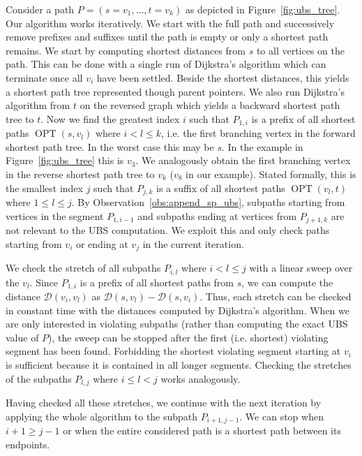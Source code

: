 \documentclass[a4paper,UKenglish,cleveref, autoref, thm-restate]{lipics-v2021}
\newcommand*{\dist}{\mathcal{D}}
\newcommand*{\shp}{\operatorname{OPT}}
\begin{document}
Consider a path $P=(s=v_1,\dots,t=v_k)$ as depicted in Figure~\ref{fig:ubs_tree}.
Our algorithm works iteratively.
We start with the full path and successively remove prefixes and suffixes until the path is empty or only a shortest path remains.
We start by computing shortest distances from $s$ to all vertices on the path.
This can be done with a single run of Dijkstra's algorithm which can terminate once all $v_i$ have been settled.
Beside the shortest distances, this yields a shortest path tree represented though parent pointers.
We also run Dijkstra's algorithm from $t$ on the reversed graph which yields a backward shortest path tree to $t$.
Now we find the greatest index $i$ such that $P_{1,i}$ is a prefix of all shortest paths $\shp(s, v_l)$ where $i < l \leq k$, i.e. the first branching vertex in the forward shortest path tree.
In the worst case this may be $s$.
In the example in Figure~\ref{fig:ubs_tree} this is $v_3$.
We analogously obtain the first branching vertex in the reverse shortest path tree to $v_k$ ($v_8$ in our example).
Stated formally, this is the smallest index $j$ such that $P_{j,k}$ is a suffix of all shortest paths $\shp(v_l, t)$ where $1 \leq l \leq j$.
By Observation~\ref{obs:append_sp_ubs}, subpaths starting from vertices in the segment $P_{1,i-1}$ and subpaths ending at vertices from $P_{j+1,k}$ are not relevant to the UBS computation.
We exploit this and only check paths starting from $v_i$ or ending at $v_j$ in the current iteration.

We check the stretch of all subpaths $P_{i,l}$ where $i < l \leq j$ with a linear sweep over the $v_l$.
Since $P_{1,i}$ is a prefix of all shortest paths from $s$, we can compute the distance $\dist(v_i, v_l)$ as $\dist(s, v_l) - \dist(s, v_i)$.
Thus, each stretch can be checked in constant time with the distances computed by Dijkstra's algorithm.
When we are only interested in violating subpaths (rather than computing the exact UBS value of $P$), the sweep can be stopped after the first (i.e. shortest) violating segment has been found.
Forbidding the shortest violating segment starting at $v_i$ is sufficient because it is contained in all longer segments.
Checking the stretches of the subpaths $P_{l,j}$ where $i \leq l < j$ works analogously.

Having checked all these stretches, we continue with the next iteration by applying the whole algorithm to the subpath $P_{i+1,j-1}$.
We can stop when $i+1 \geq j-1$ or when the entire considered path is a shortest path between its endpoints.
\end{document}
